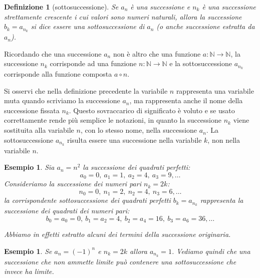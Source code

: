 \documentclass[italian,a4paper,oneside,headinclude]{scrbook}
\newcommand{\myemph}[1]{\emph{#1}\marginpar{#1}}
\newcommand{\NN}{\mathbb N}
\newtheorem{example}[theorem]{Esempio}
\newtheorem{definition}[theorem]{Definizione}
\begin{document}
\begin{definition}[sottosuccessione]
Se $a_n$ è una successione e $n_k$ è una successione strettamente crescente i cui valori sono numeri naturali, allora la successione
$b_k = a_{n_k}$ si dice essere una \myemph{sottosuccessione} di $a_n$
(o anche \emph{successione estratta} da $a_n$).
\end{definition}

Ricordando che una successione $a_n$ non è altro che una funzione
$a\colon \NN \to \NN$, la successione $n_k$ corrisponde ad una funzione
$n\colon \NN \to \NN$ e la sottosuccessione $a_{n_k}$ corrisponde alla funzione composta $a \circ n$.

Si osservi che nella definizione precedente la variabile $n$ rappresenta
una variabile muta quando scriviamo la successione $a_n$, ma
rappresenta anche il nome della successione fissata $n_k$.
Questo sovraccarico
di significato è voluto e se usato correttamente rende più semplice
le notazioni, in quanto la successione $n_k$ viene sostituita alla
variabile $n$, con lo stesso nome, nella successione $a_n$.
La sottosuccessione $a_{n_k}$ risulta essere una successione nella variabile $k$, non nella variabile $n$.

\begin{example}
Sia $a_n = n^2$ la successione dei quadrati perfetti:
\[
  a_0 = 0,\
  a_1 = 1,\
  a_2 = 4,\
  a_3 =9, \dots
\]
Consideriamo la successione dei numeri pari $n_k = 2k$:
\[
 n_0 = 0,\
 n_1 = 2,\
 n_2=4,\
 n_3=6, \dots
\]
la corrispondente sottosuccessione dei quadrati perfetti $b_k = a_{n_k}$
rappresenta la successione dei quadrati dei numeri pari:
\[
b_0 = a_0 = 0,\
b_1 = a_2 = 4,\
b_2 = a_4 = 16,\
b_3 = a_6 = 36, \dots
\]

Abbiamo in effetti \emph{estratto} alcuni dei termini della successione
originaria.
\end{example}

\begin{example}
Se $a_n = (-1)^n$ e $n_k=2k$ allora $a_{n_k} = 1$.
Vediamo quindi che una successione che non ammette limite
può contenere una sottosuccessione che invece ha limite.
\end{example}
\end{document}
